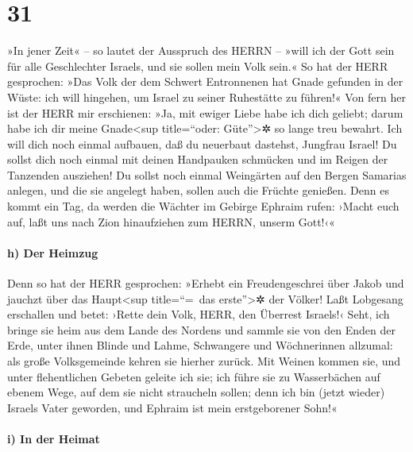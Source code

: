 \hypertarget{section-30}{%
\section{31}\label{section-30}}

»In jener Zeit« -- so lautet der Ausspruch des HERRN --
»will ich der Gott sein für alle Geschlechter Israels, und sie sollen
mein Volk sein.« So hat der HERR gesprochen: »Das Volk der
dem Schwert Entronnenen hat Gnade gefunden in der Wüste: ich will
hingehen, um Israel zu seiner Ruhestätte zu führen!« Von
fern her ist der HERR mir erschienen: »Ja, mit ewiger Liebe habe ich
dich geliebt; darum habe ich dir meine Gnade\textless sup title=``oder:
Güte''\textgreater✲ so lange treu bewahrt. Ich will dich
noch einmal aufbauen, daß du neuerbaut dastehst, Jungfrau Israel! Du
sollst dich noch einmal mit deinen Handpauken schmücken und im Reigen
der Tanzenden ausziehen! Du sollst noch einmal Weingärten
auf den Bergen Samarias anlegen, und die sie angelegt haben, sollen auch
die Früchte genießen. Denn es kommt ein Tag, da werden die
Wächter im Gebirge Ephraim rufen: ›Macht euch auf, laßt uns nach Zion
hinaufziehen zum HERRN, unserm Gott!‹«

\hypertarget{h-der-heimzug}{%
\paragraph{h) Der Heimzug}\label{h-der-heimzug}}

Denn so hat der HERR gesprochen: »Erhebt ein
Freudengeschrei über Jakob und jauchzt über das Haupt\textless sup
title=``=~das erste''\textgreater✲ der Völker! Laßt Lobgesang erschallen
und betet: ›Rette dein Volk, HERR, den Überrest Israels!‹
Seht, ich bringe sie heim aus dem Lande des Nordens und
sammle sie von den Enden der Erde, unter ihnen Blinde und Lahme,
Schwangere und Wöchnerinnen allzumal: als große Volksgemeinde kehren sie
hierher zurück. Mit Weinen kommen sie, und unter
flehentlichen Gebeten geleite ich sie; ich führe sie zu Wasserbächen auf
ebenem Wege, auf dem sie nicht straucheln sollen; denn ich bin (jetzt
wieder) Israels Vater geworden, und Ephraim ist mein erstgeborener
Sohn!«

\hypertarget{i-in-der-heimat}{%
\paragraph{i) In der Heimat}\label{i-in-der-heimat}}

